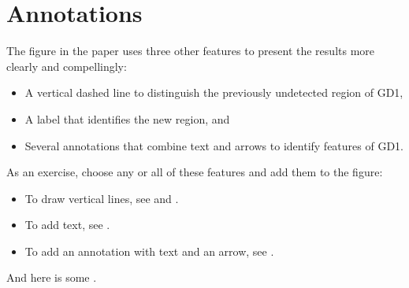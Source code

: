 \documentclass[letterpaper,10pt,english]{sphinxmanual}
\begin{document}
\noindent{}


\section{Annotations}
\label{\detokenize{07_plot:annotations}}
The figure in the paper uses three other features to present the results more clearly and compellingly:
\begin{itemize}
\item {} 
A vertical dashed line to distinguish the previously undetected region of GD\sphinxhyphen{}1,

\item {} 
A label that identifies the new region, and

\item {} 
Several annotations that combine text and arrows to identify features of GD\sphinxhyphen{}1.

\end{itemize}

As an exercise, choose any or all of these features and add them to the figure:
\begin{itemize}
\item {} 
To draw vertical lines, see  and .

\item {} 
To add text, see .

\item {} 
To add an annotation with text and an arrow, see .

\end{itemize}

And here is some .
\end{document}

